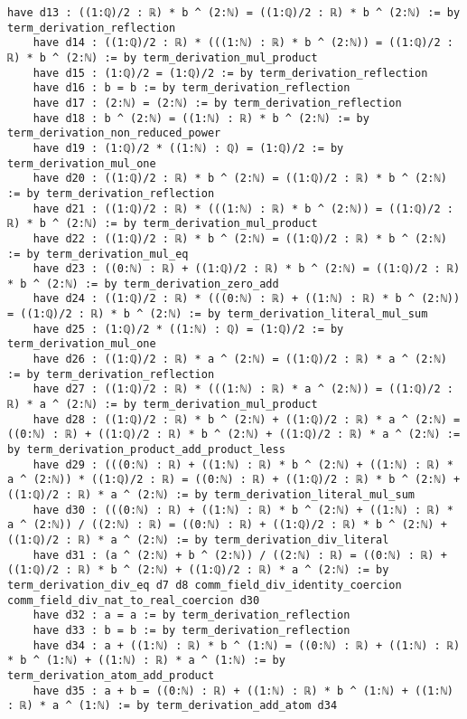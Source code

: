 \documentclass{article}
\begin{document}
\begin{tcolorbox}[colback=white!10, width=\linewidth]
\begin{lstlisting}[language=Lean4]
    have d13 : ((1:ℚ)/2 : ℝ) * b ^ (2:ℕ) = ((1:ℚ)/2 : ℝ) * b ^ (2:ℕ) := by term_derivation_reflection
    have d14 : ((1:ℚ)/2 : ℝ) * (((1:ℕ) : ℝ) * b ^ (2:ℕ)) = ((1:ℚ)/2 : ℝ) * b ^ (2:ℕ) := by term_derivation_mul_product
    have d15 : (1:ℚ)/2 = (1:ℚ)/2 := by term_derivation_reflection
    have d16 : b = b := by term_derivation_reflection
    have d17 : (2:ℕ) = (2:ℕ) := by term_derivation_reflection
    have d18 : b ^ (2:ℕ) = ((1:ℕ) : ℝ) * b ^ (2:ℕ) := by term_derivation_non_reduced_power
    have d19 : (1:ℚ)/2 * ((1:ℕ) : ℚ) = (1:ℚ)/2 := by term_derivation_mul_one
    have d20 : ((1:ℚ)/2 : ℝ) * b ^ (2:ℕ) = ((1:ℚ)/2 : ℝ) * b ^ (2:ℕ) := by term_derivation_reflection
    have d21 : ((1:ℚ)/2 : ℝ) * (((1:ℕ) : ℝ) * b ^ (2:ℕ)) = ((1:ℚ)/2 : ℝ) * b ^ (2:ℕ) := by term_derivation_mul_product
    have d22 : ((1:ℚ)/2 : ℝ) * b ^ (2:ℕ) = ((1:ℚ)/2 : ℝ) * b ^ (2:ℕ) := by term_derivation_mul_eq
    have d23 : ((0:ℕ) : ℝ) + ((1:ℚ)/2 : ℝ) * b ^ (2:ℕ) = ((1:ℚ)/2 : ℝ) * b ^ (2:ℕ) := by term_derivation_zero_add
    have d24 : ((1:ℚ)/2 : ℝ) * (((0:ℕ) : ℝ) + ((1:ℕ) : ℝ) * b ^ (2:ℕ)) = ((1:ℚ)/2 : ℝ) * b ^ (2:ℕ) := by term_derivation_literal_mul_sum
    have d25 : (1:ℚ)/2 * ((1:ℕ) : ℚ) = (1:ℚ)/2 := by term_derivation_mul_one
    have d26 : ((1:ℚ)/2 : ℝ) * a ^ (2:ℕ) = ((1:ℚ)/2 : ℝ) * a ^ (2:ℕ) := by term_derivation_reflection
    have d27 : ((1:ℚ)/2 : ℝ) * (((1:ℕ) : ℝ) * a ^ (2:ℕ)) = ((1:ℚ)/2 : ℝ) * a ^ (2:ℕ) := by term_derivation_mul_product
    have d28 : ((1:ℚ)/2 : ℝ) * b ^ (2:ℕ) + ((1:ℚ)/2 : ℝ) * a ^ (2:ℕ) = ((0:ℕ) : ℝ) + ((1:ℚ)/2 : ℝ) * b ^ (2:ℕ) + ((1:ℚ)/2 : ℝ) * a ^ (2:ℕ) := by term_derivation_product_add_product_less
    have d29 : (((0:ℕ) : ℝ) + ((1:ℕ) : ℝ) * b ^ (2:ℕ) + ((1:ℕ) : ℝ) * a ^ (2:ℕ)) * ((1:ℚ)/2 : ℝ) = ((0:ℕ) : ℝ) + ((1:ℚ)/2 : ℝ) * b ^ (2:ℕ) + ((1:ℚ)/2 : ℝ) * a ^ (2:ℕ) := by term_derivation_literal_mul_sum
    have d30 : (((0:ℕ) : ℝ) + ((1:ℕ) : ℝ) * b ^ (2:ℕ) + ((1:ℕ) : ℝ) * a ^ (2:ℕ)) / ((2:ℕ) : ℝ) = ((0:ℕ) : ℝ) + ((1:ℚ)/2 : ℝ) * b ^ (2:ℕ) + ((1:ℚ)/2 : ℝ) * a ^ (2:ℕ) := by term_derivation_div_literal
    have d31 : (a ^ (2:ℕ) + b ^ (2:ℕ)) / ((2:ℕ) : ℝ) = ((0:ℕ) : ℝ) + ((1:ℚ)/2 : ℝ) * b ^ (2:ℕ) + ((1:ℚ)/2 : ℝ) * a ^ (2:ℕ) := by term_derivation_div_eq d7 d8 comm_field_div_identity_coercion comm_field_div_nat_to_real_coercion d30
    have d32 : a = a := by term_derivation_reflection
    have d33 : b = b := by term_derivation_reflection
    have d34 : a + ((1:ℕ) : ℝ) * b ^ (1:ℕ) = ((0:ℕ) : ℝ) + ((1:ℕ) : ℝ) * b ^ (1:ℕ) + ((1:ℕ) : ℝ) * a ^ (1:ℕ) := by term_derivation_atom_add_product
    have d35 : a + b = ((0:ℕ) : ℝ) + ((1:ℕ) : ℝ) * b ^ (1:ℕ) + ((1:ℕ) : ℝ) * a ^ (1:ℕ) := by term_derivation_add_atom d34

\end{lstlisting}
\end{tcolorbox}
\end{document}
